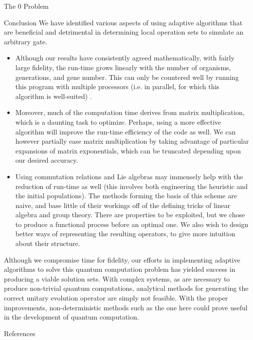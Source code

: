 \documentclass[12pt]{beamer}
\begin{document}
\begin{frame}
\begin{columns}
\begin{column}{.45\textwidth}
\begin{block}{The 0 Problem}
	\end{block}
				\vspace{1em}
								\begin{exampleblock}{Conclusion}
We have identified various aspects of using adaptive algorithms that are beneficial and detrimental in determining local operation sets to simulate an arbitrary gate. 
	\begin{itemize}
\item Although our results have consistently agreed mathematically, with fairly large fidelity, the run-time grows linearly with the number of organisms, generations, and gene number. This can only be countered well by running this program with multiple processors (i.e. in parallel, for which this algorithm is well-suited) \cite{umbarkar}.
\item Moreover, much of the computation time derives from matrix multiplication, which is a daunting task to optimize. Perhaps, using a more effective algorithm will improve the run-time efficiency of the code as well. We can however partially ease matrix multiplication by taking advantage of particular expansions of matrix exponentials, which can be truncated depending upon our desired accuracy.
\item Using commutation relations and Lie algebras may immensely help with the reduction of run-time as well (this involves both engineering the heuristic and the initial populations). The methods forming the basis of this scheme are naive, and base little of their workings off of the defining tricks of linear algebra and group theory. There are properties to be exploited, but we chose to produce a functional process before an optimal one. We also wish to design better ways of representing the resulting operators, to give more intuition about their structure. %
\end{itemize}
Although we compromise time for fidelity, our efforts in implementing adaptive algorithms to solve this quantum computation problem has yielded success in producing a viable solution sets. With complex systems, as are necessary to produce non-trivial quantum computations, analytical methods for generating the correct unitary evolution operator are simply not feasible. With the proper improvements, non-deterministic methods such as the one here could prove useful in the development of quantum computation. 


					
				\end{exampleblock}
				\vspace{1em}
				
				\begin{block}{References}

					
						
				\end{block}
			\end{column}	
		\end{columns}
	\end{frame}	
\centering
\end{document}
